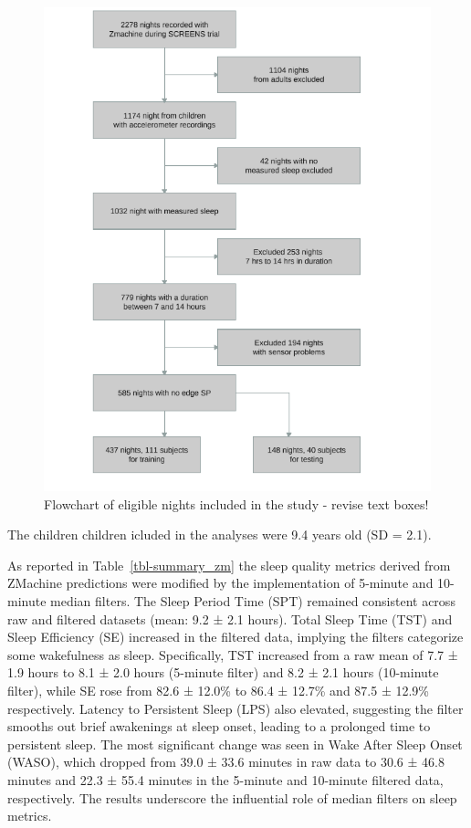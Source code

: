 \documentclass[
  super,
  preprint,
  3p]{elsarticle}
\begin{document}
\begin{figure}[b]

{\centering \includegraphics{visuals/flowchart_of_elligible_nights.pdf}

}

\caption{Flowchart of eligible nights included in the study - revise
text boxes!}

\end{figure}

The children children icluded in the analyses were 9.4 years old (SD =
2.1).

As reported in Table~\ref{tbl-summary_zm} the sleep quality metrics
derived from ZMachine predictions were modified by the implementation of
5-minute and 10-minute median filters. The Sleep Period Time (SPT)
remained consistent across raw and filtered datasets (mean: 9.2 ± 2.1
hours). Total Sleep Time (TST) and Sleep Efficiency (SE) increased in
the filtered data, implying the filters categorize some wakefulness as
sleep. Specifically, TST increased from a raw mean of 7.7 ± 1.9 hours to
8.1 ± 2.0 hours (5-minute filter) and 8.2 ± 2.1 hours (10-minute
filter), while SE rose from 82.6 ± 12.0\% to 86.4 ± 12.7\% and 87.5 ±
12.9\% respectively. Latency to Persistent Sleep (LPS) also elevated,
suggesting the filter smooths out brief awakenings at sleep onset,
leading to a prolonged time to persistent sleep. The most significant
change was seen in Wake After Sleep Onset (WASO), which dropped from
39.0 ± 33.6 minutes in raw data to 30.6 ± 46.8 minutes and 22.3 ± 55.4
minutes in the 5-minute and 10-minute filtered data, respectively. The
results underscore the influential role of median filters on sleep
metrics.
\end{document}

